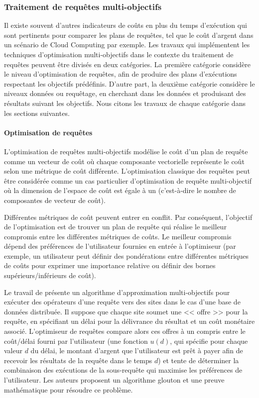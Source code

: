 \subsubsection{Traitement de requêtes multi-objectifs}
Il existe souvent d'autres indicateurs de coûts en plus du temps d'exécution qui sont pertinents pour comparer les plans de requêtes, tel que le coût d'argent dans un scénario de Cloud Computing par exemple.
Les travaux qui implémentent les techniques d'optimisation multi-objectifs dans le contexte du traitement de requêtes peuvent être divisés en deux catégories. La première catégorie considère le niveau d'optimisation de requêtes, afin de produire des plans d'exécutions respectant les objectifs prédéfinis. D'autre part, la deuxième catégorie considère le niveaux données ou requêtage, en cherchant dans les données et produisant des résultats suivant les objectifs. Nous citons les travaux de chaque catégorie dans les sections suivantes.

\paragraph{Optimisation de requêtes}
L'optimisation de requêtes multi-objectifs modélise le coût d'un plan de requête comme un vecteur de coût où chaque composante vectorielle représente le coût selon une métrique de coût différente. L'optimisation classique des requêtes peut être considérée comme un cas particulier d'optimisation de requête multi-objectif où la dimension de l'espace de coût est égale à un (c'est-à-dire le nombre de composantes de vecteur de coût).

Différentes métriques de coût peuvent entrer en conflit. Par conséquent, l'objectif de l'optimisation est de trouver un plan de requête qui réalise le meilleur compromis entre les différentes métriques de coûts. Le meilleur compromis dépend des préférences de l'utilisateur fournies en entrée à l'optimiseur (par exemple, un utilisateur peut définir des pondérations entre différentes métriques de coûts pour exprimer une importance relative ou définir des bornes supérieurs/inférieurs de coût).

Le travail de \cite{Papadimitriou01} présente un algorithme d'approximation multi-objectifs pour exécuter des opérateurs d'une requête vers des sites dans le cas d'une base de données distribuée. Il suppose que chaque site soumet une << offre >> pour la requête, en spécifiant un délai pour la délivrance du résultat et un coût monétaire associé. L'optimiseur de requêtes compare alors ces offres à un compris entre le coût/délai fourni par l'utilisateur (une fonction $u(d)$, qui spécifie pour chaque valeur $d$ du délai, le montant d'argent que l'utilisateur est prêt à payer afin de recevoir les résultats de la requête dans le temps $d$) et tente de déterminer la combinaison des exécutions de la sous-requête qui maximise les préférences de l'utilisateur. Les auteurs proposent un algorithme glouton et une preuve mathématique pour résoudre ce problème.

